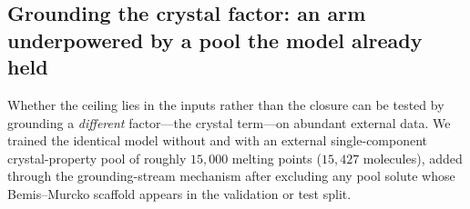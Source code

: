 \subsection{Grounding the crystal factor: an arm underpowered by a pool the model already held} \label{sec:e2}

Whether the ceiling lies in the inputs rather than the closure can be tested by grounding a \emph{different} factor---the crystal term---on abundant external data. We trained the identical model without and with an external single-component crystal-property pool of roughly $15{,}000$ melting points ($15{,}427$ molecules), added through the grounding-stream mechanism after excluding any pool solute whose Bemis--Murcko scaffold appears in the validation or test split.

